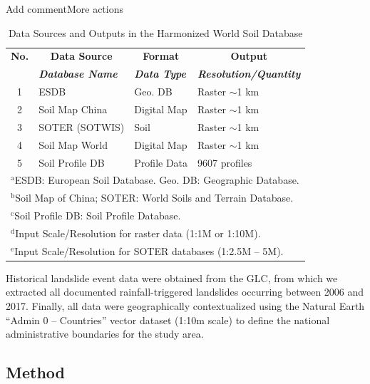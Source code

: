 \begin{table}[H]Add commentMore actions
\caption{Data Sources and Outputs in the Harmonized World Soil Database}
\centering
\begin{tabular}{|c|l|l|l|} %
\hline
\textbf{No.} & \multicolumn{1}{|c|}{\textbf{Data Source}} & \multicolumn{1}{|c|}{\textbf{Format}} & \multicolumn{1}{|c|}{\textbf{Output}} \\
\cline{2-4} %
\textbf{} & \textbf{\textit{Database Name}} & \textbf{\textit{Data Type}} & \textbf{\textit{Resolution/Quantity}} \\
\hline
1 & ESDB & Geo. DB & Raster $\sim$1 km \\
\hline
2 & Soil Map China & Digital Map & Raster $\sim$1 km \\
\hline
3 & SOTER (SOTWIS) & Soil & Raster $\sim$1 km \\
\hline
4 & Soil Map World & Digital Map & Raster $\sim$1 km \\
\hline
5 & Soil Profile DB & Profile Data & 9607 profiles \\
\hline
\multicolumn{4}{l}{$^{\mathrm{a}}$ESDB: European Soil Database. Geo. DB: Geographic Database.} \\
\multicolumn{4}{l}{$^{\mathrm{b}}$Soil Map of China; SOTER: World Soils and Terrain Database.} \\
\multicolumn{4}{l}{$^{\mathrm{c}}$Soil Profile DB: Soil Profile Database.} \\
\multicolumn{4}{l}{$^{\mathrm{d}}$Input Scale/Resolution for raster data (1:1M or 1:10M).} \\
\multicolumn{4}{l}{$^{\mathrm{e}}$Input Scale/Resolution for SOTER databases (1:2.5M – 5M).}
\end{tabular}
\label{tab:hwsd_sources_compact}
\end{table}

Historical landslide event data were obtained from the GLC, from which we extracted all documented rainfall-triggered landslides occurring between 2006 and 2017. Finally, all data were geographically contextualized using the Natural Earth “Admin 0 – Countries” vector dataset (1:10m scale) to define the national administrative boundaries for the study area.









\subsection{Method}


